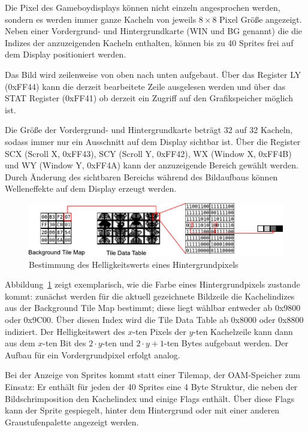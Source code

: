 \documentclass[a4paper]{scrartcl}
\begin{document}
Die Pixel des Gameboydisplays können nicht einzeln angesprochen werden, sondern es werden immer ganze Kacheln von jeweils $8 \times 8$ Pixel Größe angezeigt. Neben einer Vordergrund- und Hintergrundkarte (WIN und BG genannt) die die Indizes der anzuzeigenden Kacheln enthalten, können bis zu 40 Sprites frei auf dem Display positioniert werden.

Das Bild wird zeilenweise von oben nach unten aufgebaut. Über das Register LY (0xFF44) kann die derzeit bearbeitete Zeile ausgelesen werden und über das STAT Register (0xFF41) ob derzeit ein Zugriff auf den Grafikspeicher möglich ist.

Die Größe der Vordergrund- und Hintergrundkarte beträgt 32 auf 32 Kacheln, sodass immer nur ein Ausschnitt auf dem Display sichtbar ist. Über die Register SCX (Scroll X, 0xFF43), SCY (Scroll Y, 0xFF42), WX (Window X, 0xFF4B) und WY (Window Y, 0xFF4A) kann der anzuzeigende Bereich gewählt werden. Durch Änderung des sichtbaren Bereichs während des Bildaufbaus können Welleneffekte auf dem Display erzeugt werden.

\begin{figure}[htbp]
\centering
\includegraphics[width=\linewidth]{img/bg_tiles}
\caption{Bestimmung des Helligkeitswerts eines Hintergrundpixels}
\label{img:bg_tiles}
\end{figure}

Abbildung~\ref{img:bg_tiles} zeigt exemplarisch, wie die Farbe eines Hintergrundpixels zustande kommt: zunächst werden für die aktuell gezeichnete Bildzeile die Kachelindizes aus der Background Tile Map bestimmt; diese liegt wählbar entweder ab 0x9800 oder 0x9C00. Über diesen Index wird die Tile Data Table ab 0x8000 oder 0x8800 indiziert. Der Helligkeitswert des $x$-ten Pixels der $y$-ten Kachelzeile kann dann aus dem $x$-ten Bit des $2 \cdot y$-ten und $2 \cdot y+1$-ten Bytes aufgebaut werden. Der Aufbau für ein Vordergrundpixel erfolgt analog.

Bei der Anzeige von Sprites kommt statt einer Tilemap, der OAM-Speicher zum Einsatz: Er enthält für jeden der 40 Sprites eine 4 Byte Struktur, die neben der Bildschrimposition den Kachelindex und einige Flags enthält. Über diese Flags kann der Sprite gespiegelt, hinter dem Hintergrund oder mit einer anderen Graustufenpalette angezeigt werden.
\end{document}
